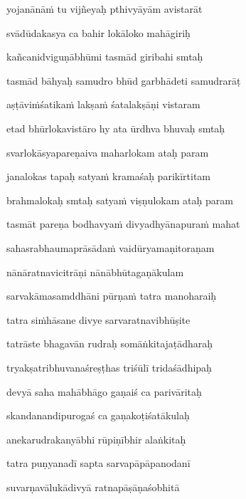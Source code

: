 yojanānā\.m tu vijñeyaḥ pthivyāyām avistarāt \veg\dontdisplaylinenum

svādūdakasya ca bahir lokāloko mahāgiriḥ\thinspace{\dandab} \dontdisplaylinenum

kañcanidviguṇābhūmi tasmād giribahi smtaḥ \veg\dontdisplaylinenum

tasmād bāhyaḥ samudro bhūd garbhādeti samudrarāṭ\thinspace{\dandab} \dontdisplaylinenum

aṣṭāvi\.mśatika\.m lakṣa\.m śatalakṣāṇi vistaram \veg\dontdisplaylinenum

etad bhūrlokavistāro hy ata ūrdhva bhuvaḥ smtaḥ\thinspace{\dandab} \dontdisplaylinenum

svarlokāsyapareṇaiva maharlokam ataḥ param \veg\dontdisplaylinenum

janalokas tapaḥ satya\.m kramaśaḥ parikīrtitam\thinspace{\dandab} \dontdisplaylinenum

brahmalokaḥ smtaḥ satya\.m viṣṇulokam ataḥ param \veg\dontdisplaylinenum


tasmāt pareṇa bodhavya\.m divyadhyānapura\.m mahat\thinspace{\dandab} \dontdisplaylinenum

sahasrabhaumaprāsāda\.m vaidūryamaṇitoraṇam \veg\dontdisplaylinenum

nānāratnavicitrāṇi nānābhūtagaṇākulam\thinspace{\dandab} \dontdisplaylinenum

sarvakāmasamddhāni pūrṇa\.m tatra manoharaiḥ \veg\dontdisplaylinenum

tatra si\.mhāsane divye sarvaratnavibhūṣite\thinspace{\dandab} \dontdisplaylinenum

tatrāste bhagavān rudraḥ somāṅkitajaṭādharaḥ \veg\dontdisplaylinenum

tryakṣatribhuvanaśreṣṭhas triśūlī tridaśādhipaḥ\thinspace{\dandab} \dontdisplaylinenum

devyā saha mahābhāgo gaṇaiś ca parivāritaḥ \veg\dontdisplaylinenum

skandanandipurogaś ca gaṇakoṭiśatākulaḥ\thinspace{\dandab} \dontdisplaylinenum

anekarudrakanyābhi rūpiṇībhir alaṅkitaḥ \veg\dontdisplaylinenum

tatra puṇyanadī sapta sarvapāpāpanodanī\thinspace{\dandab} \dontdisplaylinenum

suvarṇavālukādivyā ratnapāṣāṇaśobhitā \veg\dontdisplaylinenum

